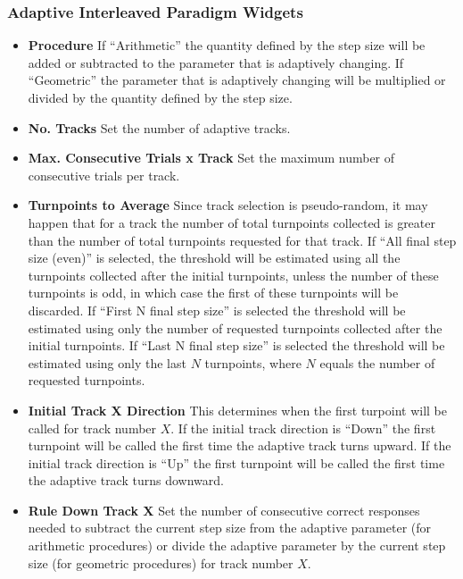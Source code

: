 \documentclass[a4paper,12pt,english]{sphinxmanual}
\begin{document}
\subsubsection{Adaptive Interleaved Paradigm Widgets}
\label{graphical_user_interface:adaptive-interleaved-paradigm-widgets}\begin{itemize}
\item {} 
\textbf{Procedure} If “Arithmetic” the quantity defined by the step size
will be added or subtracted to the parameter that is adaptively
changing. If “Geometric” the parameter that is adaptively changing
will be multiplied or divided by the quantity defined by the step
size.

\item {} 
\textbf{No. Tracks} Set the number of adaptive tracks.

\item {} 
\textbf{Max. Consecutive Trials x Track} Set the maximum number of
consecutive trials per track.

\item {} 
\textbf{Turnpoints to Average} Since track selection is pseudo-random, it
may happen that for a track the number of total turnpoints collected
is greater than the number of total turnpoints requested for that
track. If “All final step size (even)” is selected, the threshold
will be estimated using all the turnpoints collected after the
initial turnpoints, unless the number of these turnpoints is odd, in
which case the first of these turnpoints will be discarded. If “First
N final step size” is selected the threshold will be estimated using
only the number of requested turnpoints collected after the initial
turnpoints. If “Last N final step size” is selected the threshold
will be estimated using only the last $N$ turnpoints, where
$N$ equals the number of requested turnpoints.

\item {} 
\textbf{Initial Track X Direction} This determines when the first turpoint
will be called for track number $X$. If the initial track
direction is “Down” the first turnpoint will be called the first time
the adaptive track turns upward. If the initial track direction is
“Up” the first turnpoint will be called the first time the adaptive
track turns downward.

\item {} 
\textbf{Rule Down Track X} Set the number of consecutive correct responses
needed to subtract the current step size from the adaptive parameter
(for arithmetic procedures) or divide the adaptive parameter by the
current step size (for geometric procedures) for track number
$X$.


\end{itemize}
\end{document}
